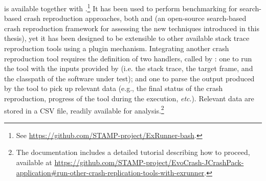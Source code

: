 \exrunner is available together with \crashpack.\footnote{See \url{https://github.com/STAMP-project/ExRunner-bash}.}
It has been used to perform benchmarking for search-based crash reproduction approaches, both \evocrash and \botsing (an open-source search-based crash reproduction framework for assessing the new techniques introduced in this thesis), yet it has been designed to be extensible to other available stack trace reproduction tools using a plugin mechanism. 
Integrating another crash reproduction tool requires the definition of two handlers, called by \exrunner: one to run the tool with the inputs provided by \exrunner (i.e. the stack trace, the target frame, and the classpath of the software under test); and one to parse the output produced by the tool to pick up relevant data (e.g., the final status of the crash reproduction, progress of the tool during the execution, \textit{etc}.). 
Relevant data are stored in a CSV file, readily available for analysis.\footnote{ The \exrunner documentation includes a detailed tutorial describing how to proceed, available at \url{https://github.com/STAMP-project/EvoCrash-JCrashPack-application\#run-other-crash-replication-tools-with-exrunner}.}

